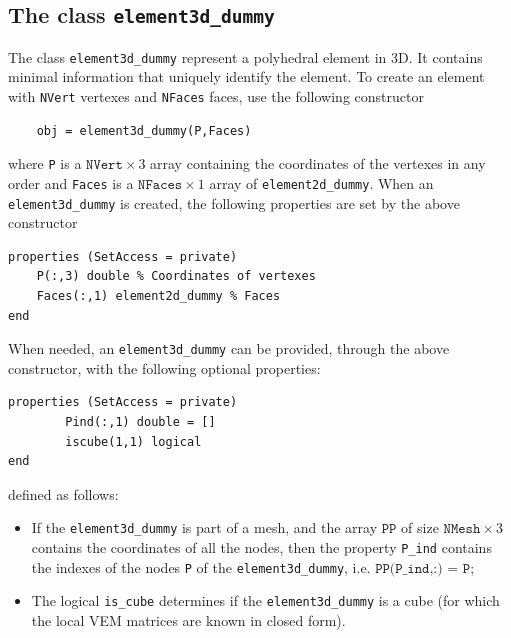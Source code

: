\documentclass[a4paper]{article}
\begin{document}
\subsection{The class \texttt{element3d\_dummy}}
The class \texttt{element3d\_dummy} represent a polyhedral element in 3D. It contains minimal information that uniquely identify the element. To create an element with \texttt{NVert} vertexes and \texttt{NFaces} faces, use the following constructor
\begin{lstlisting}
	obj = element3d_dummy(P,Faces)
\end{lstlisting}
where \texttt{P} is a $\texttt{NVert} \times 3$ array containing the coordinates of the vertexes in any order and \texttt{Faces} is a $\texttt{NFaces} \times 1$ array of \texttt{element2d\_dummy}.  When an \texttt{element3d\_dummy} is created, the following properties are set by the above constructor
\begin{lstlisting}
properties (SetAccess = private)
	P(:,3) double % Coordinates of vertexes
	Faces(:,1) element2d_dummy % Faces
end
\end{lstlisting}
When needed, an \texttt{element3d\_dummy} can be provided, through the above constructor, with the following optional properties:
\begin{lstlisting}
properties (SetAccess = private)
        Pind(:,1) double = []
        iscube(1,1) logical
end
\end{lstlisting}
defined as follows:
\begin{itemize}
\item If the \texttt{element3d\_dummy} is part of a mesh, and the array $\texttt{PP}$ of size $\texttt{NMesh} \times 3$ contains the coordinates of all the nodes, then the property \texttt{P\_ind} contains the indexes of the nodes \texttt{P} of the \texttt{element3d\_dummy}, i.e. $\texttt{PP(P\_ind,:) = P}$;
\item The logical \texttt{is\_cube} determines if the \texttt{element3d\_dummy} is a cube (for which the local VEM matrices are known in closed form).
\end{itemize}
\end{document}
